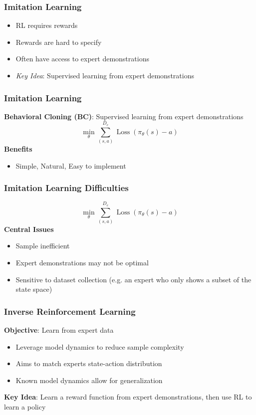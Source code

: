 \documentclass{beamer}
\DeclareMathOperator{\loss}{Loss}
\begin{document}
\begin{frame}
\frametitle{Imitation Learning}
	\begin{itemize}
		\item RL requires rewards
		\vfill
		\item Rewards are hard to specify
		\vfill
		\item Often have access to expert demonstrations
		\vfill
		\item \emph{Key Idea}: Supervised learning from expert demonstrations
	\end{itemize}
\end{frame}

\begin{frame}
\frametitle{Imitation Learning}
	\textbf{Behavioral Cloning (BC)}: Supervised learning from expert demonstrations
	\[ 
		\min_{\theta} \sum_{(s,a)}^{D_e} \loss \left(\pi_\theta(s) - a \right)
	\]
	\vfill
	\textbf{Benefits}
	\begin{itemize}
		\item Simple, Natural, Easy to implement
	\end{itemize}
\end{frame}

\begin{frame}
	\frametitle{Imitation Learning Difficulties}
	\[ 
		\min_{\theta} \sum_{(s,a)}^{D_e} \loss \left(\pi_\theta(s) - a \right)
	\]
	\vfill
	\textbf{Central Issues}
	\begin{itemize}
		\item Sample inefficient
		\item Expert demonstrations may not be optimal
		\item Sensitive to dataset collection (e.g. an expert who only shows a subset of the state space)
	\end{itemize}
\end{frame}

\begin{frame}
	\frametitle{Inverse Reinforcement Learning}
	\textbf{Objective}: Learn from expert data
	\begin{itemize}
		\item Leverage model dynamics to reduce sample complexity
		\item Aims to match experts state-action distribution
		\item Known model dynamics allow for generalization
	\end{itemize}
	\vfill
	\textbf{Key Idea}: Learn a reward function from expert demonstrations, then use RL to learn a policy
\end{frame}
\end{document}
